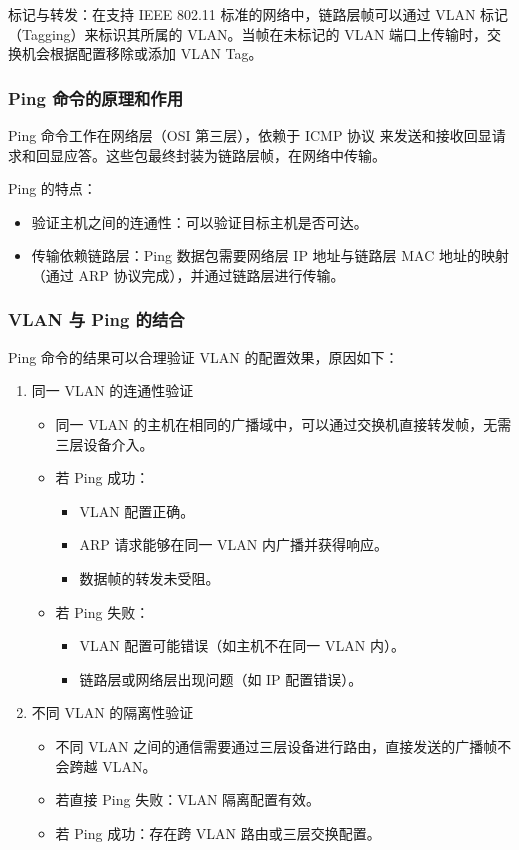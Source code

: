 \documentclass[11pt]{article}
\begin{document}
标记与转发：在支持 IEEE 802.11 标准的网络中，链路层帧可以通过 VLAN 标记（Tagging）来标识其所属的 VLAN。当帧在未标记的 VLAN 端口上传输时，交换机会根据配置移除或添加 VLAN Tag。

\subsubsection{Ping 命令的原理和作用}
\label{sec:org0aca5a0}
Ping 命令工作在网络层（OSI 第三层），依赖于 ICMP 协议 来发送和接收回显请求和回显应答。这些包最终封装为链路层帧，在网络中传输。

Ping 的特点：

\begin{itemize}
\item 验证主机之间的连通性：可以验证目标主机是否可达。
\item 传输依赖链路层：Ping 数据包需要网络层 IP 地址与链路层 MAC 地址的映射（通过 ARP 协议完成），并通过链路层进行传输。
\end{itemize}

\subsubsection{VLAN 与 Ping 的结合}
\label{sec:org402a165}
Ping 命令的结果可以合理验证 VLAN 的配置效果，原因如下：
\begin{enumerate}
\item 同一 VLAN 的连通性验证
\begin{itemize}
\item 同一 VLAN 的主机在相同的广播域中，可以通过交换机直接转发帧，无需三层设备介入。
\item 若 Ping 成功：
\begin{itemize}
\item VLAN 配置正确。
\item ARP 请求能够在同一 VLAN 内广播并获得响应。
\item 数据帧的转发未受阻。
\end{itemize}
\item 若 Ping 失败：
\begin{itemize}
\item VLAN 配置可能错误（如主机不在同一 VLAN 内）。
\item 链路层或网络层出现问题（如 IP 配置错误）。
\end{itemize}
\end{itemize}
\item 不同 VLAN 的隔离性验证
\begin{itemize}
\item 不同 VLAN 之间的通信需要通过三层设备进行路由，直接发送的广播帧不会跨越 VLAN。
\item 若直接 Ping 失败：VLAN 隔离配置有效。
\item 若 Ping 成功：存在跨 VLAN 路由或三层交换配置。
\end{itemize}
\end{enumerate}
\end{document}
